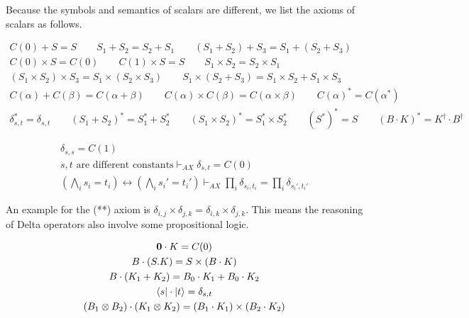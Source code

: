 \documentclass[manuscript, review, timestamp]{acmart}
\begin{document}
Because the symbols and semantics of scalars are different, we list the axioms of scalars as follows.

\begin{definition}
  \begin{gather*}
    C(0) + S = S
    \qquad
    S_1 + S_2 = S_2 + S_1
    \qquad
    (S_1 + S_2) + S_3 = S_1 + (S_2 + S_3) \\
    C(0) \times S = C(0)
    \qquad
    C(1) \times S = S
    \qquad
    S_1 \times S_2 = S_2 \times S_1 \\
    (S_1 \times S_2) \times S_3 = S_1 \times (S_2 \times S_3)
    \qquad
    S_1 \times (S_2 + S_3) = S_1 \times S_2 + S_1 \times S_3 \\
    C(\alpha) + C(\beta) = C(\alpha + \beta)
    \qquad
    C(\alpha) \times C(\beta) = C(\alpha \times \beta)
    \qquad
    C(\alpha)^* = C(\alpha^*) \\
    \delta_{s, t}^* = \delta_{s, t}
    \qquad
    (S_1 + S_2)^* = S_1^* + S_2^*
    \qquad
    (S_1 \times S_2)^* = S_1^* \times S_2^*
    \qquad
    (S^*)^* = S
    \qquad
    (B \cdot K)^* = K^\dagger \cdot B^\dagger
  \end{gather*}  
\end{definition}

\begin{definition}
  \label{def: SCR-DELTA}
  \begin{gather*}
    \delta_{s, s} = C(1) \\
    s, t \text{ are different constants} \vdash_{AX} \delta_{s, t} = C(0)  \tag{*} \\
    (\bigwedge_i s_i = t_i) \leftrightarrow (\bigwedge_i s_i' = t_i') \vdash_{AX} \prod_i \delta_{s_i, t_i} = \prod_i \delta_{s_i', t_i'} \tag{**}
  \end{gather*}
\end{definition}

An example for the (**) axiom is $\delta_{i, j} \times \delta_{j, k} = \delta_{i, k} \times \delta_{j, k}$. This means the reasoning of Delta operators also involve some propositional logic.

\begin{definition}
  \begin{gather*}
    \mathbf{0} \cdot K = C(0) \\
    B \cdot (S.K) = S \times (B \cdot K) \\
    B \cdot (K_1 + K_2) = B_0 \cdot K_1 + B_0 \cdot K_2 \\
    \bra{s} \cdot \ket{t} = \delta_{s, t} \\
    (B_1 \otimes B_2) \cdot (K_1 \otimes K_2) = (B_1 \cdot K_1) \times (B_2 \cdot K_2)
  \end{gather*}
\end{definition}
\end{document}

